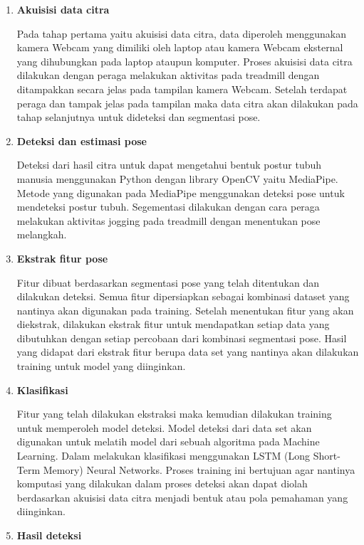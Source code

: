 \begin{enumerate} [label=\textbf{\arabic*}., listparindent=2em]
  \item \textbf{Akuisisi data citra}
  
  Pada tahap pertama yaitu akuisisi data citra, data diperoleh menggunakan kamera Webcam yang dimiliki oleh laptop atau kamera Webcam eksternal yang dihubungkan pada laptop ataupun komputer. Proses akuisisi data citra dilakukan dengan peraga melakukan aktivitas pada treadmill dengan ditampakkan secara jelas pada tampilan kamera Webcam. Setelah terdapat peraga dan tampak jelas pada tampilan maka data citra akan dilakukan pada tahap selanjutnya untuk dideteksi dan segmentasi pose.
  
  \item \textbf{Deteksi dan estimasi pose}
  
  Deteksi dari hasil citra untuk dapat mengetahui bentuk postur tubuh manusia menggunakan Python dengan library OpenCV yaitu MediaPipe. Metode yang digunakan pada MediaPipe menggunakan deteksi pose untuk mendeteksi postur tubuh. Segementasi dilakukan dengan cara peraga melakukan aktivitas jogging pada treadmill dengan menentukan pose melangkah.

  \item \textbf{Ekstrak fitur pose}
  
  Fitur dibuat berdasarkan segmentasi pose yang telah ditentukan dan dilakukan deteksi. Semua fitur dipersiapkan sebagai kombinasi dataset yang nantinya akan digunakan pada training. Setelah menentukan fitur yang akan diekstrak, dilakukan ekstrak fitur untuk mendapatkan setiap data yang dibutuhkan dengan setiap percobaan dari kombinasi segmentasi pose. Hasil yang didapat dari ekstrak fitur berupa data set yang nantinya akan dilakukan training untuk model yang diinginkan.

  \item \textbf{Klasifikasi}
  
  Fitur yang telah dilakukan ekstraksi maka kemudian dilakukan training untuk memperoleh model deteksi. Model deteksi dari data set akan digunakan untuk melatih model dari sebuah algoritma pada Machine Learning. Dalam melakukan klasifikasi menggunakan LSTM (Long Short-Term Memory) Neural Networks. Proses training ini bertujuan agar nantinya komputasi yang dilakukan dalam proses deteksi akan dapat diolah berdasarkan akuisisi data citra menjadi bentuk atau pola pemahaman yang diinginkan. 

  \item \textbf{Hasil deteksi}
  

\end{enumerate}
